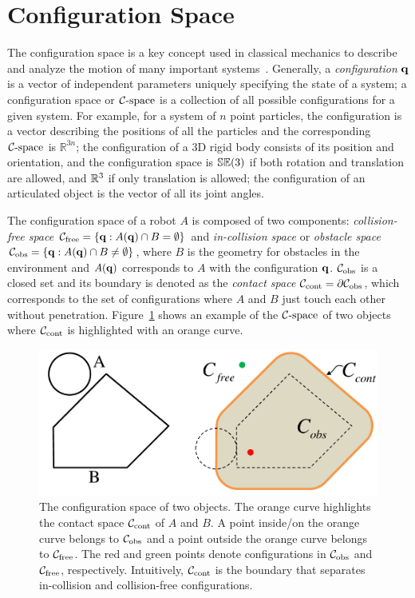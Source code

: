 \section{Configuration Space}
\label{sec:1:configurationSpace}
The configuration space is a key concept used in classical mechanics to describe and analyze the motion of many important systems~\cite{Arnold:1989}. Generally, a \emph{configuration} $\mathbf q$ is a vector of independent parameters uniquely specifying the state of a system; a configuration space or $\mathcal C\text{-space}$ is a collection of all possible configurations for a given system. For example, for a system of $n$ point particles, the configuration is a vector describing the positions of all the particles and the corresponding $\mathcal C\text{-space}$ is $\mathbb R^{3n}$; the configuration of a 3D rigid body consists of its position and orientation, and the configuration space is $\mathbb {SE}(3)$ if both rotation and translation are allowed, and $\mathbb R^3$ if only translation is allowed; the configuration of an articulated object is the vector of all its joint angles.

The configuration space of a robot $A$ is composed of two components: \emph{collision-free space} $\mathcal C_{\text{free}} = \{\mathbf q: A(\mathbf q) \cap B = \emptyset\}$ and \emph{in-collision space} or \emph{obstacle space} $\mathcal C_{\text{obs}} = \{\mathbf q: A(\mathbf q) \cap B \neq \emptyset\}$, where $B$ is the geometry for obstacles in the environment and $A(\mathbf q)$ corresponds to $A$ with the configuration $\mathbf q$. $\mathcal C_{\text{obs}}$ is a closed set and its boundary is denoted as the \emph{contact space} $\mathcal C_\text{cont} = \partial \mathcal C_{\text{obs}}$, which corresponds to the set of configurations where $A$ and $B$ just touch each other without penetration. Figure~\ref{fig:1:contactspace} shows an example of the $\mathcal C\text{-space}$ of two objects where $\mathcal C_\text{cont}$ is highlighted with an orange curve.

\begin{figure}[!htb]
  \centering
  \includegraphics[width=0.6\linewidth]{figs/1/Ccont.pdf}
  \caption[The configuration space of two objects]{The configuration space of two objects. The orange curve highlights the contact space $\mathcal C_\text{cont}$ of $A$ and $B$. A point inside/on the orange curve belongs to
  $\mathcal C_{\text{obs}}$ and a point outside the orange curve belongs to $\mathcal C_{\text{free}}$.
  The red and green points denote configurations in $\mathcal C_{\text{obs}}$ and $\mathcal C_{\text{free}}$, respectively. Intuitively, $\mathcal C_\text{cont}$ is the boundary that separates in-collision and collision-free configurations.}
  \label{fig:1:contactspace}
\end{figure}

